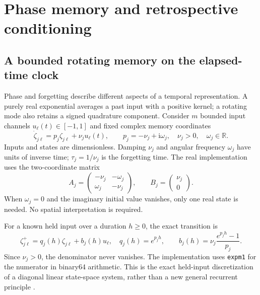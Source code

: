 \documentclass[11pt,a4paper]{article}
\theoremstyle{definition}\newtheorem{definition}[theorem]{Definition}
\newcommand{\R}{\mathbb{R}}
\begin{document}
\section{Phase memory and retrospective conditioning}\label{sec:phase}
\subsection{A bounded rotating memory on the elapsed-time clock}
Phase and forgetting describe different aspects of a temporal representation. A purely real exponential averages a past input with a positive kernel; a rotating mode also retains a signed quadrature component. Consider $m$ bounded input channels $u_\ell(t)\in[-1,1]$ and fixed complex memory coordinates
\begin{equation}
 \dot\zeta_{j\ell}=p_j\zeta_{j\ell}+\nu_j u_\ell(t),
 \qquad p_j=-\nu_j+\mathrm i\omega_j,\quad \nu_j>0,
 \quad \omega_j\in\R.\label{eq:phaseode}
\end{equation}
Inputs and states are dimensionless. Damping $\nu_j$ and angular frequency $\omega_j$ have units of inverse time; $\tau_j=1/\nu_j$ is the forgetting time. The real implementation uses the two-coordinate matrix
\begin{equation}
 A_j=\begin{pmatrix}-\nu_j&-\omega_j\\ \omega_j&-\nu_j\end{pmatrix},
 \qquad B_j=\begin{pmatrix}\nu_j\\0\end{pmatrix}.
\end{equation}
When $\omega_j=0$ and the imaginary initial value vanishes, only one real state is needed. No spatial interpretation is required.

For a known held input over a duration $h\geq0$, the exact transition is
\begin{equation}
 \zeta^+_{j\ell}=q_j(h)\zeta_{j\ell}+b_j(h)u_\ell,
 \quad q_j(h)=e^{p_jh},\qquad
 b_j(h)=\nu_j\frac{e^{p_jh}-1}{p_j}.\label{eq:phaseexact}
\end{equation}
Since $\nu_j>0$, the denominator never vanishes. The implementation uses \texttt{expm1} for the numerator in binary64 arithmetic. This is the exact held-input discretization of a diagonal linear state-space system, rather than a new general recurrent principle \cite{gu2022diagonal,orvieto2023}.
\end{document}
